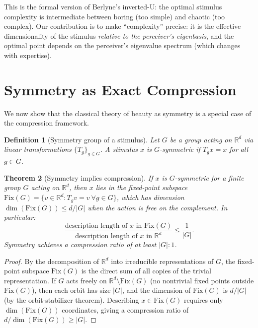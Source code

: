 \documentclass[journal]{IEEEtran}
\newtheorem{theorem}{Theorem}
\newtheorem{definition}[theorem]{Definition}
\newcommand{\R}{\mathbb{R}}
\begin{document}
This is the formal version of Berlyne's inverted-U: the optimal
stimulus complexity is intermediate between boring (too simple) and
chaotic (too complex).  Our contribution is to make ``complexity''
precise: it is the effective dimensionality of the stimulus
\emph{relative to the perceiver's eigenbasis}, and the optimal
point depends on the perceiver's eigenvalue spectrum (which changes
with expertise).


\section{Symmetry as Exact Compression}
\label{sec:symmetry}

We now show that the classical theory of beauty as symmetry is a
special case of the compression framework.

\begin{definition}[Symmetry group of a stimulus]
\label{def:symmetry}
Let $G$ be a group acting on $\R^d$ via linear transformations
$\{T_g\}_{g \in G}$.  A stimulus $x$ is \emph{$G$-symmetric} if
$T_g x = x$ for all $g \in G$.
\end{definition}

\begin{theorem}[Symmetry implies compression]
\label{thm:symmetry}
If $x$ is $G$-symmetric for a finite group $G$ acting on $\R^d$,
then $x$ lies in the fixed-point subspace
$\mathrm{Fix}(G) = \{v \in \R^d : T_g v = v \ \forall g \in G\}$,
which has dimension $\dim(\mathrm{Fix}(G)) \leq d / |G|$ when
the action is free on the complement.  In particular:
\begin{equation}
    \frac{\text{description length of } x \text{ in } \mathrm{Fix}(G)}
    {\text{description length of } x \text{ in } \R^d}
    \leq \frac{1}{|G|}.
\end{equation}
Symmetry achieves a compression ratio of at least $|G|:1$.
\end{theorem}

\begin{proof}
By the decomposition of $\R^d$ into irreducible representations of
$G$, the fixed-point subspace $\mathrm{Fix}(G)$ is the direct sum
of all copies of the trivial representation.  If $G$ acts freely on
$\R^d \setminus \mathrm{Fix}(G)$ (no nontrivial fixed points outside
$\mathrm{Fix}(G)$), then each orbit has size $|G|$, and the dimension
of $\mathrm{Fix}(G)$ is $d / |G|$ (by the orbit-stabilizer theorem).
Describing $x \in \mathrm{Fix}(G)$ requires only $\dim(\mathrm{Fix}(G))$
coordinates, giving a compression ratio of $d / \dim(\mathrm{Fix}(G))
\geq |G|$.
\end{proof}
\end{document}
